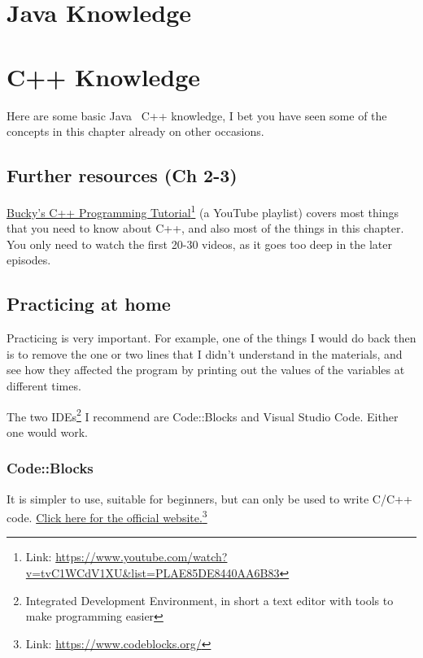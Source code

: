 
\if{}
\chapter{Java Knowledge}
\else
\chapter{C++ Knowledge}
\fi


Here are some basic\if{} Java \else ~C++ \fi knowledge, I bet you have seen some of the concepts in this chapter already on other occasions.


\section{Further resources (Ch 2-3)}
\href{https://www.youtube.com/watch?v=tvC1WCdV1XU&list=PLAE85DE8440AA6B83}{Bucky's C++ Programming Tutorial}\footnote{Link: \href{https://www.youtube.com/watch?v=tvC1WCdV1XU&list=PLAE85DE8440AA6B83}{https://www.youtube.com/watch?v=tvC1WCdV1XU\&list=PLAE85DE8440AA6B83}} (a YouTube playlist) covers most things that you need to know about C++, and also most of the things in this chapter. You only need to watch the first 20-30 videos, as it goes too deep in the later episodes.

\section{Practicing at home}
Practicing is very important. For example, one of the things I would do back then is to remove the one or two lines that I didn't understand in the materials, and see how they affected the program by printing out the values of the variables at different times. 

The two IDEs\footnote{Integrated Development Environment, in short a text editor with tools to make programming easier} I recommend are Code::Blocks and Visual Studio Code. Either one would work.

\subsection*{Code::Blocks}

It is simpler to use, suitable for beginners, but can only be used to write C/C++ code. \href{https://www.codeblocks.org/}{Click here for the official website.}\footnote{Link: \href{https://www.codeblocks.org/}{https://www.codeblocks.org/}}

